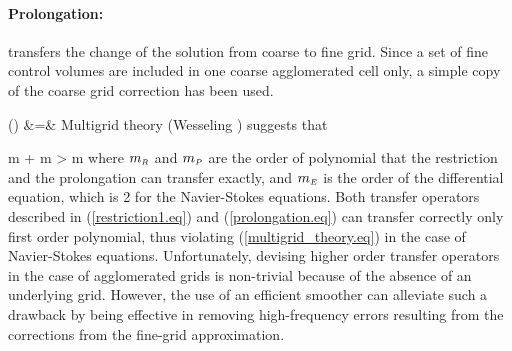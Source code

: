 \paragraph{Prolongation:} transfers the change of the solution from
 coarse to fine grid. Since a set of fine control volumes are included
 in one coarse agglomerated cell only, a simple copy of the coarse
 grid correction has been used.

%
\beq
  \Theta{}
  \left(\right) &=& 
  \label{prolongation.eq}
\eeq
%
 Multigrid theory (Wesseling ) suggests that

%
\beq
  m + m > m
  \label{multigrid_theory.eq}
\eeq
%
 where $m_{\mbox{\tiny $R$}}$ and $m_{\mbox{\tiny $P$}}$ are the order of polynomial that
 the restriction and the prolongation can transfer exactly, and $m_{\mbox{\tiny $E$}}$
 is the order of the differential equation, which is 2 for the
 Navier-Stokes equations.
 Both transfer operators described in (\ref{restriction1.eq}) and
 (\ref{prolongation.eq}) can transfer correctly only first order
 polynomial, thus violating (\ref{multigrid_theory.eq}) in the case of
 Navier-Stokes equations.
 Unfortunately, devising higher order transfer operators in the case
 of agglomerated grids is non-trivial because of the absence of an
 underlying grid. However, the use of an efficient smoother can
 alleviate such a drawback by being effective in removing
 high-frequency errors resulting from the corrections from the fine-grid
 approximation.
%
%
%
%
%
